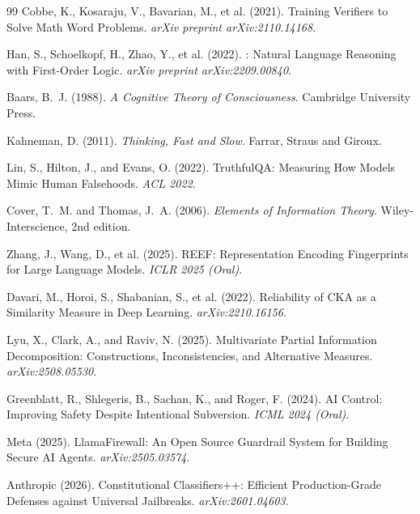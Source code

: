\documentclass[11pt,a4paper]{article}
\theoremstyle{remark}
\begin{document}
\begin{thebibliography}{99}
Cobbe, K., Kosaraju, V., Bavarian, M., et al. (2021).
\newblock Training Verifiers to Solve Math Word Problems.
\newblock \emph{arXiv preprint arXiv:2110.14168}.

Han, S., Schoelkopf, H., Zhao, Y., et al. (2022).
: Natural Language Reasoning with First-Order Logic.
\newblock \emph{arXiv preprint arXiv:2209.00840}.

Baars, B.~J. (1988).
\newblock \emph{A Cognitive Theory of Consciousness}.
\newblock Cambridge University Press.

Kahneman, D. (2011).
\newblock \emph{Thinking, Fast and Slow}.
\newblock Farrar, Straus and Giroux.

Lin, S., Hilton, J., and Evans, O. (2022).
\newblock TruthfulQA: Measuring How Models Mimic Human Falsehoods.
\newblock \emph{ACL 2022}.

Cover, T.~M. and Thomas, J.~A. (2006).
\newblock \emph{Elements of Information Theory}.
\newblock Wiley-Interscience, 2nd edition.

Zhang, J., Wang, D., et al. (2025).
\newblock REEF: Representation Encoding Fingerprints for Large Language Models.
\newblock \emph{ICLR 2025 (Oral)}.

Davari, M., Horoi, S., Shabanian, S., et al. (2022).
\newblock Reliability of CKA as a Similarity Measure in Deep Learning.
\newblock \emph{arXiv:2210.16156}.

Lyu, X., Clark, A., and Raviv, N. (2025).
\newblock Multivariate Partial Information Decomposition: Constructions, Inconsistencies, and Alternative Measures.
\newblock \emph{arXiv:2508.05530}.

Greenblatt, R., Shlegeris, B., Sachan, K., and Roger, F. (2024).
\newblock AI Control: Improving Safety Despite Intentional Subversion.
\newblock \emph{ICML 2024 (Oral)}.

Meta (2025).
\newblock LlamaFirewall: An Open Source Guardrail System for Building Secure AI Agents.
\newblock \emph{arXiv:2505.03574}.

Anthropic (2026).
\newblock Constitutional Classifiers++: Efficient Production-Grade Defenses against Universal Jailbreaks.
\newblock \emph{arXiv:2601.04603}.


\end{thebibliography}
\end{document}
